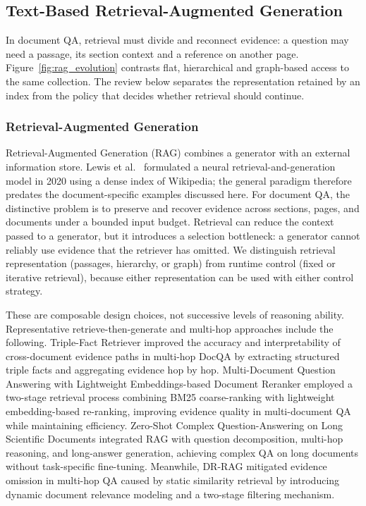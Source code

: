 \subsection{Text-Based Retrieval-Augmented Generation}

In document QA, retrieval must divide and reconnect evidence: a question may need a passage, its section context and a reference on another page. Figure~\ref{fig:rag_evolution} contrasts flat, hierarchical and graph-based access to the same collection. The review below separates the representation retained by an index from the policy that decides whether retrieval should continue.
\subsubsection{Retrieval-Augmented Generation}

Retrieval-Augmented Generation (RAG) combines a generator with an external information store. Lewis et al.~\cite{lewis2020rag} formulated a neural retrieval-and-generation model in 2020 using a dense index of Wikipedia; the general paradigm therefore predates the document-specific examples discussed here. For document QA, the distinctive problem is to preserve and recover evidence across sections, pages, and documents under a bounded input budget. Retrieval can reduce the context passed to a generator, but it introduces a selection bottleneck: a generator cannot reliably use evidence that the retriever has omitted. We distinguish retrieval representation (passages, hierarchy, or graph) from runtime control (fixed or iterative retrieval), because either representation can be used with either control strategy.

These are composable design choices, not successive levels of reasoning ability. Representative retrieve-then-generate and multi-hop approaches include the following. Triple-Fact Retriever \cite{wu2022triple} improved the accuracy and interpretability of cross-document evidence paths in multi-hop DocQA by extracting structured triple facts and aggregating evidence hop by hop. Multi-Document Question Answering with Lightweight Embeddings-based Document Reranker \cite{aitymbetov2024multi} employed a two-stage retrieval process combining BM25 coarse-ranking with lightweight embedding-based re-ranking, improving evidence quality in multi-document QA while maintaining efficiency. Zero-Shot Complex Question-Answering on Long Scientific Documents \cite{wang2025zero} integrated RAG with question decomposition, multi-hop reasoning, and long-answer generation, achieving complex QA on long documents without task-specific fine-tuning. Meanwhile, DR-RAG \cite{hei2024dr} mitigated evidence omission in multi-hop QA caused by static similarity retrieval by introducing dynamic document relevance modeling and a two-stage filtering mechanism.


